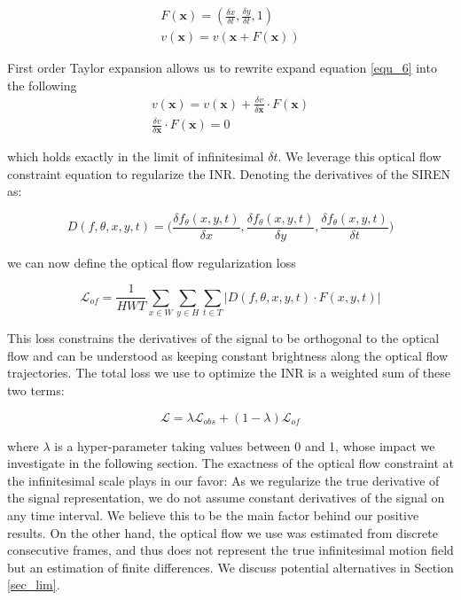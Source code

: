\documentclass{article}
\begin{document}
\begin{equation}
\begin{aligned}
F(\textbf{x})=(\frac{\delta x}{\delta t}, \frac{\delta y}{\delta t}, 1) \\
v(\textbf{x})=v(\textbf{x} + F(\textbf{x}))
\end{aligned}
\label{equ_6}
\end{equation}

First order Taylor expansion allows us to rewrite expand equation \ref{equ_6} into the following
\begin{equation}
\begin{aligned}
v(\textbf{x}) = v(\textbf{x}) + \frac{\delta v}{\delta \textbf{x}} \cdot F(\textbf{x}) \\
\frac{\delta v}{\delta \textbf{x}} \cdot F(\textbf{x}) =0
\end{aligned}
\end{equation}


which holds exactly in the limit of infinitesimal $\delta t$.
We leverage this optical flow constraint equation to regularize the INR.
Denoting the derivatives of the SIREN as:

\begin{equation}
D(f, \theta, x, y, t)=\Big(\frac{\delta f_{\theta}(x,y,t)}{\delta x}, \frac{\delta f_{\theta}(x,y,t)}{\delta y}, \frac{\delta f_{\theta}(x,y,t)}{\delta t}\Big)
\end{equation}

we can now define the optical flow regularization loss

\begin{equation}
\mathcal{L}_{of} = \frac{1}{HWT} \sum_{x \in W}\sum_{y \in H}\sum_{t \in T} | D(f, \theta, x, y, t) \cdot F(x, y, t) |
\end{equation}

This loss constrains the derivatives of the signal to be orthogonal to the optical flow and
can be understood as keeping constant brightness along the optical flow trajectories.
The total loss we use to optimize the INR is a weighted sum of these two terms:

\begin{equation}
\mathcal{L} = \lambda \mathcal{L}_{obs} + (1-\lambda) \mathcal{L}_{of}
\end{equation}

where $\lambda$ is a hyper-parameter taking values between 0 and 1, whose impact we investigate in the following section.
The exactness of the optical flow constraint at the infinitesimal scale plays in our favor:
As we regularize the true derivative of the signal representation,
we do not assume constant derivatives of the signal on any time interval.
We believe this to be the main factor behind our positive results.
On the other hand, the optical flow we use was estimated from discrete consecutive frames,
and thus does not represent the true infinitesimal motion field but an estimation of finite differences.
We discuss potential alternatives in Section \ref{sec_lim}.
\end{document}
